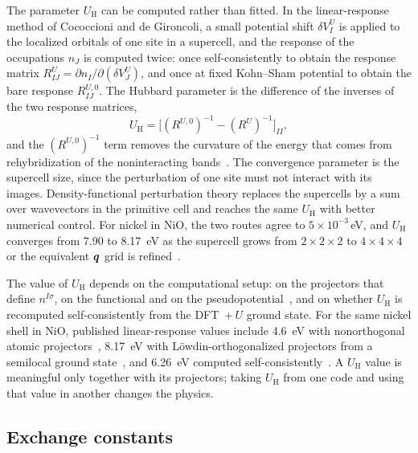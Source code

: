 The parameter $U_{\mathrm{H}}$ can be computed rather than fitted. In the linear-response method of Cococcioni and de Gironcoli, a small potential shift $\delta V^U_I$ is applied to the localized orbitals of one site in a supercell, and the response of the occupations $n_J$ is computed twice: once self-consistently to obtain the response matrix $R^U_{IJ} = \partial n_I/\partial(\delta V^U_J)$, and once at fixed Kohn--Sham potential to obtain the bare response $R^{U,0}_{IJ}$. The Hubbard parameter is the difference of the inverses of the two response matrices,
\begin{equation}
  U_{\mathrm{H}} = \bigl[(R^{U,0})^{-1} - (R^U)^{-1}\bigr]_{II} ,
  \label{eq:E.9-Ulr}
\end{equation}
and the $(R^{U,0})^{-1}$ term removes the curvature of the energy that comes from rehybridization of the noninteracting bands~\cite[Eqs.~(15), (18) and~(19)]{cococcioni2005linear}. The convergence parameter is the supercell size, since the perturbation of one site must not interact with its images. Density-functional perturbation theory replaces the supercells by a sum over wavevectors in the primitive cell and reaches the same $U_{\mathrm{H}}$ with better numerical control. For nickel in NiO, the two routes agree to $5\times10^{-3}$\,eV, and $U_{\mathrm{H}}$ converges from 7.90 to \SI{8.17}{eV} as the supercell grows from $2\times2\times2$ to $4\times4\times4$ or the equivalent $\bm{q}$ grid is refined~\cite[Table~I]{timrov2018hubbard}.

The value of $U_{\mathrm{H}}$ depends on the computational setup: on the projectors that define $n^{I\sigma}$, on the functional and on the pseudopotential~\cite[Sect.~V]{timrov2018hubbard}, and on whether $U_{\mathrm{H}}$ is recomputed self-consistently from the DFT~$+\,U$ ground state. For the same nickel shell in NiO, published linear-response values include \SI{4.6}{eV} with nonorthogonal atomic projectors~\cite[Sect.~V]{cococcioni2005linear}, \SI{8.17}{eV} with Löwdin-orthogonalized projectors from a semilocal ground state~\cite[Table~I]{timrov2018hubbard}, and \SI{6.26}{eV} computed self-consistently~\cite[Sect.~II]{dossantos2026comparative}. A $U_{\mathrm{H}}$ value is meaningful only together with its projectors; taking $U_{\mathrm{H}}$ from one code and using that value in another changes the physics.

\subsection{Exchange constants}

